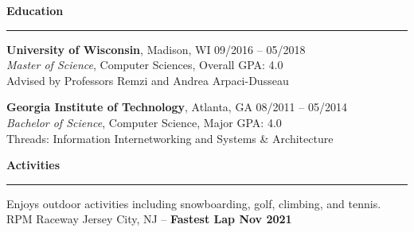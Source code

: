 \documentclass[10pt]{article}
\newcommand{\resumeSection}[1]{
  \vspace{0.45em}
  {\large\bfseries #1}\par
  \vspace{0.12em}
  \hrule
  \vspace{0.28em}
}
\begin{document}
\resumeSection{Education}
\textbf{University of Wisconsin}, Madison, WI \hfill 09/2016 -- 05/2018 \\
\textit{Master of Science}, Computer Sciences, Overall GPA: 4.0 \\
Advised by Professors Remzi and Andrea Arpaci-Dusseau

\vspace{0.18em}
\textbf{Georgia Institute of Technology}, Atlanta, GA \hfill 08/2011 -- 05/2014 \\
\textit{Bachelor of Science}, Computer Science, Major GPA: 4.0 \\
Threads: Information Internetworking and Systems \& Architecture

\resumeSection{Activities}
Enjoys outdoor activities including snowboarding, golf, climbing, and tennis. \\
RPM Raceway Jersey City, NJ -- \textbf{Fastest Lap Nov 2021}
\end{document}
